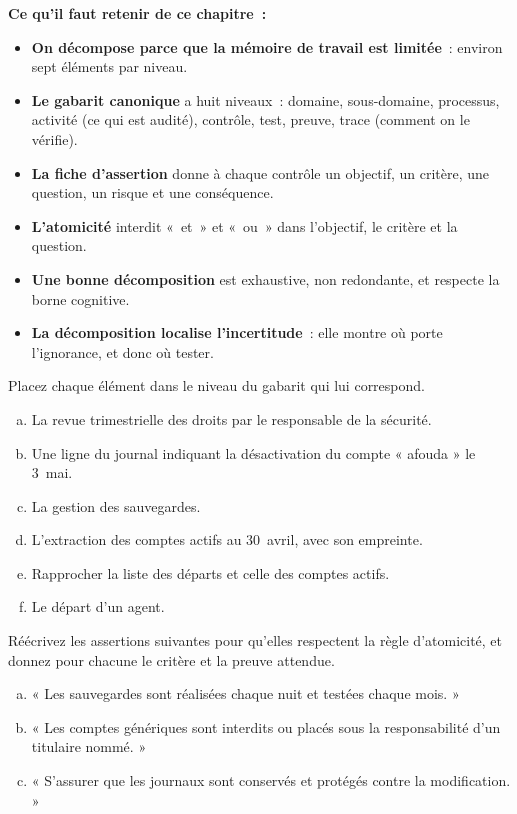 \begin{boxresume}
\textbf{Ce qu'il faut retenir de ce chapitre~:}
\begin{itemize}
    \item \textbf{On décompose parce que la mémoire de travail est
          limitée}~: environ sept éléments par niveau.
    \item \textbf{Le gabarit canonique} a huit niveaux~: domaine,
          sous-domaine, processus, activité (ce qui est audité), contrôle,
          test, preuve, trace (comment on le vérifie).
    \item \textbf{La fiche d'assertion} donne à chaque contrôle un objectif,
          un critère, une question, un risque et une conséquence.
    \item \textbf{L'atomicité} interdit «~et~» et «~ou~» dans l'objectif, le
          critère et la question.
    \item \textbf{Une bonne décomposition} est exhaustive, non redondante,
          et respecte la borne cognitive.
    \item \textbf{La décomposition localise l'incertitude}~: elle montre où
          porte l'ignorance, et donc où tester.
\end{itemize}
\end{boxresume}

\bigskip

\begin{boxexo}[title={\ding{45}\quad Exercice~7.1. À quel niveau~? \niveaubase}]
Placez chaque élément dans le niveau du gabarit qui lui correspond.
\begin{enumerate}[(a)]
    \item La revue trimestrielle des droits par le responsable de la
          sécurité.
    \item Une ligne du journal indiquant la désactivation du compte
          « afouda » le 3~mai.
    \item La gestion des sauvegardes.
    \item L'extraction des comptes actifs au 30~avril, avec son empreinte.
    \item Rapprocher la liste des départs et celle des comptes actifs.
    \item Le départ d'un agent.
\end{enumerate}
\end{boxexo}

\begin{boxexo}[title={\ding{45}\quad Exercice~7.2. Rendre atomique \niveaumoyen}]
Réécrivez les assertions suivantes pour qu'elles respectent la règle
d'atomicité, et donnez pour chacune le critère et la preuve attendue.
\begin{enumerate}[(a)]
    \item « Les sauvegardes sont réalisées chaque nuit et testées chaque
          mois. »
    \item « Les comptes génériques sont interdits ou placés sous la
          responsabilité d'un titulaire nommé. »
    \item « S'assurer que les journaux sont conservés et protégés contre la
          modification. »
\end{enumerate}
\end{boxexo}

